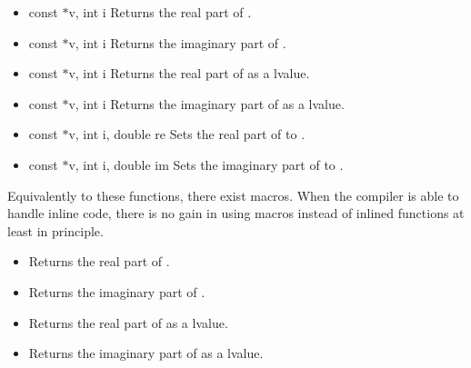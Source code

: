 \begin{itemize}
\item {}
  {const  $\ast$v, int i}
  \sshortdescribe Returns the real part of .
  
\item {}
  {const  $\ast$v, int i}
  \sshortdescribe Returns the imaginary part of .

\item {}
  {const  $\ast$v, int i}
  \sshortdescribe Returns the real part of  as a lvalue.

\item {}
  {const  $\ast$v, int i}
  \sshortdescribe Returns the imaginary part of  as a lvalue.

\item {}
  {const  $\ast$v, int i, double re}
  \sshortdescribe Sets the real part of  to .

\item {}
  {const  $\ast$v, int i, double im}
  \sshortdescribe Sets the imaginary part of  to .
\end{itemize}

Equivalently to these functions, there exist macros. When the compiler is able
to handle inline code, there is no gain in using macros instead of inlined
functions at least in principle.
\begin{itemize}
\item {}
  \sshortdescribe Returns the real part of .
  
\item {}
  \sshortdescribe Returns the imaginary part of .
  
\item {}
  \sshortdescribe Returns the real part of  as a lvalue.
  
\item {}
  \sshortdescribe Returns the imaginary part of  as a lvalue.
\end{itemize}

